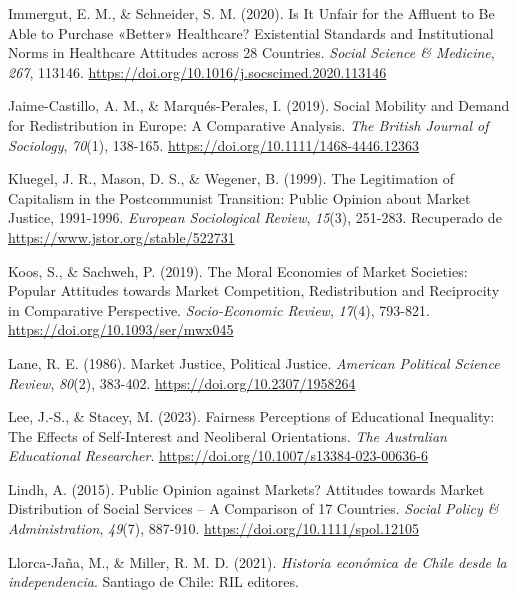 \documentclass[
  spanish,
  letterpaper,
  DIV=11,
  numbers=noendperiod,
  oneside]{scrartcl}
\newlength{\cslhangindent}
\newenvironment{CSLReferences}[2] %
 {\begin{list}{}{%
  \setlength{\itemindent}{0pt}
  \setlength{\leftmargin}{0pt}
  \setlength{\parsep}{0pt}
  \ifodd #1
   \setlength{\leftmargin}{\cslhangindent}
   \setlength{\itemindent}{-1\cslhangindent}
  \fi
  \setlength{\itemsep}{#2\baselineskip}}}
 {\end{list}}
\begin{document}
\begin{CSLReferences}{1}{0}
Immergut, E. M., \& Schneider, S. M. (2020). Is It Unfair for the
Affluent to Be Able to Purchase {«Better»} Healthcare? {Existential}
Standards and Institutional Norms in Healthcare Attitudes across 28
Countries. \emph{Social Science \& Medicine}, \emph{267}, 113146.
\url{https://doi.org/10.1016/j.socscimed.2020.113146}

Jaime-Castillo, A. M., \& Marqués-Perales, I. (2019). Social Mobility
and Demand for Redistribution in {Europe}: A Comparative Analysis.
\emph{The British Journal of Sociology}, \emph{70}(1), 138-165.
\url{https://doi.org/10.1111/1468-4446.12363}

Kluegel, J. R., Mason, D. S., \& Wegener, B. (1999). The {Legitimation}
of {Capitalism} in the {Postcommunist Transition}: {Public Opinion}
about {Market Justice}, 1991-1996. \emph{European Sociological Review},
\emph{15}(3), 251-283. Recuperado de
\url{https://www.jstor.org/stable/522731}

Koos, S., \& Sachweh, P. (2019). The Moral Economies of Market
Societies: Popular Attitudes towards Market Competition, Redistribution
and Reciprocity in Comparative Perspective. \emph{Socio-Economic
Review}, \emph{17}(4), 793-821. \url{https://doi.org/10.1093/ser/mwx045}

Lane, R. E. (1986). Market {Justice}, {Political Justice}.
\emph{American Political Science Review}, \emph{80}(2), 383-402.
\url{https://doi.org/10.2307/1958264}

Lee, J.-S., \& Stacey, M. (2023). Fairness Perceptions of Educational
Inequality: The Effects of Self-Interest and Neoliberal Orientations.
\emph{The Australian Educational Researcher}.
\url{https://doi.org/10.1007/s13384-023-00636-6}

Lindh, A. (2015). Public {Opinion} against {Markets}? {Attitudes}
towards {Market Distribution} of {Social Services} -- {A Comparison} of
17 {Countries}. \emph{Social Policy \& Administration}, \emph{49}(7),
887-910. \url{https://doi.org/10.1111/spol.12105}

Llorca-Jaña, M., \& Miller, R. M. D. (2021). \emph{{Historia econ{ó}mica
de Chile desde la independencia}}. Santiago de Chile: RIL editores.


\end{CSLReferences}
\end{document}
